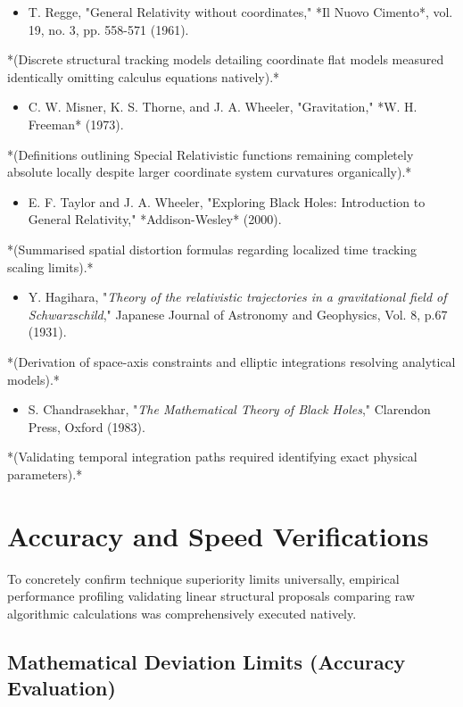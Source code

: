 \documentclass[11pt]{article}
\begin{document}
\begin{itemize}
\item [1] T. Regge, "General Relativity without coordinates," *Il Nuovo Cimento*, vol. 19, no. 3, pp. 558-571 (1961).
\end{itemize}
  *(Discrete structural tracking models detailing coordinate flat models measured identically omitting calculus equations natively).*
\begin{itemize}
\item [2] C. W. Misner, K. S. Thorne, and J. A. Wheeler, "Gravitation," *W. H. Freeman* (1973).
\end{itemize}
  *(Definitions outlining Special Relativistic functions remaining completely absolute locally despite larger coordinate system curvatures organically).*
\begin{itemize}
\item [3] E. F. Taylor and J. A. Wheeler, "Exploring Black Holes: Introduction to General Relativity," *Addison-Wesley* (2000).
\end{itemize}
  *(Summarised spatial distortion formulas regarding localized time tracking scaling limits).*
\begin{itemize}
\item [4] Y. Hagihara, "\textit{Theory of the relativistic trajectories in a gravitational field of Schwarzschild}," Japanese Journal of Astronomy and Geophysics, Vol. 8, p.67 (1931).
\end{itemize}
  *(Derivation of space-axis constraints and elliptic integrations resolving analytical models).*
\begin{itemize}
\item [5] S. Chandrasekhar, "\textit{The Mathematical Theory of Black Holes}," Clarendon Press, Oxford (1983).
\end{itemize}
  *(Validating temporal integration paths required identifying exact physical parameters).*

\section{Accuracy and Speed Verifications}

To concretely confirm technique superiority limits universally, empirical performance profiling validating linear structural proposals comparing raw algorithmic calculations was comprehensively executed natively.

\subsection{Mathematical Deviation Limits (Accuracy Evaluation)}
\end{document}
